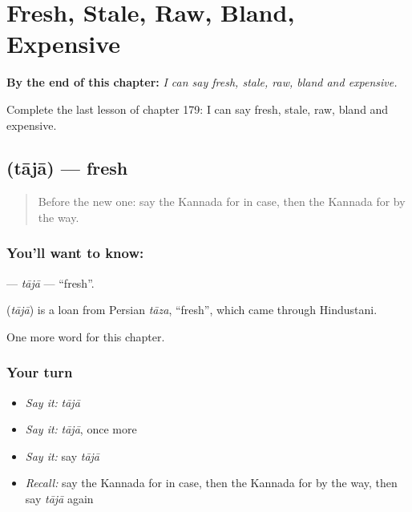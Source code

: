 
\chapter{Fresh, Stale, Raw, Bland, Expensive}
\label{ch:ka-fresh-stale-raw-bland-expensive}

\begin{chapteropening}
\textbf{By the end of this chapter:} \emph{I can say fresh, stale, raw, bland and expensive.}

Complete the last lesson of chapter 179: I can say fresh, stale, raw, bland and expensive.
\end{chapteropening}

\section[\texorpdfstring{\kn{ತಾಜಾ} (tājā)}{ತಾಜಾ (tājā)}]{ (tājā) — fresh}

\label{lesson:KA-C179-taja}



\begin{quote}
Before the new one: say the Kannada for in case, then the Kannada for by the way.
\end{quote}

\subsection*{You'll want to know: }
\textbf{} — \emph{tājā} — \textquotedblleft{}fresh\textquotedblright{}.

\begin{cousinweb}
\textbf{} (\emph{tājā}) is a loan from Persian \emph{tāza}, \textquotedblleft{}fresh\textquotedblright{}, which came through Hindustani.
\end{cousinweb}

\begin{grammarlens}[title={What you've built}]
One more word for this chapter.
\end{grammarlens}

\subsection*{Your turn}
\begin{itemize}
\raggedright
  \item \emph{Say it:} \emph{tājā}
  \item \emph{Say it:} \emph{tājā}, once more
  \item \emph{Say it:} say \emph{tājā}
  \item \emph{Recall:} say the Kannada for in case, then the Kannada for by the way, then say \emph{tājā} again
\end{itemize}

